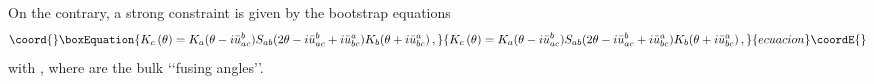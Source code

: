 \documentclass[a4paper,12pt]{report}
\begin{document}
\vspace{0.5cm}

On the contrary, a strong constraint is given by the bootstrap equations
\begin{equation}\coord{}\boxEquation{\label{boot}
K_{c}\left(\theta\right)= K_{a}(\theta-i \bar{u}_{ac}^{b})S_{ab}(2\theta-i \bar{u}_{ac}^{b}+i
\bar{u}_{bc}^{a})K_{b}(\theta+i \bar{u}_{bc}^{a})\,,
}{K_{c}\left(\theta\right)= K_{a}(\theta-i \bar{u}_{ac}^{b})S_{ab}(2\theta-i \bar{u}_{ac}^{b}+i
\bar{u}_{bc}^{a})K_{b}(\theta+i \bar{u}_{bc}^{a})\,,
}{ecuacion}\coordE{}\end{equation}
with \coordHE{}, where \coordHE{} are the bulk \lq\lq fusing angles\rq\rq.



\vspace{4.5cm}
\end{document}
